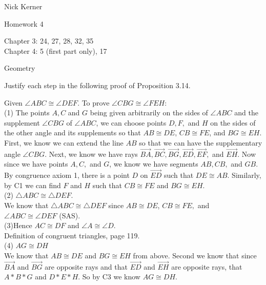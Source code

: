 \documentclass[12pt,letterpaper]{article}
\newcommand{\pro}[1]{\noindent {\bf #1}}
\begin{document}
\begin{flushright}
Nick Kerner

Homework 4

Chapter 3: 24, 27, 28, 32, 35\\
Chapter 4: 5 (first part only), 17
\end{flushright}
\begin{center}
\large{Geometry}\\
\end{center}

\pro{24} Justify each step in the following proof of Proposition 3.14.

Given $\angle ABC \cong \angle DEF$.  To prove $\angle CBG \cong \angle FEH$:\\


\noindent (1) The points $A,C$ and $G$ being given arbitrarily on the sides of $\angle ABC$ and the supplement $\angle CBG$ of $\angle ABC$, we can choose points $D,F,$ and $H$ on the sides of the other angle and its supplements so that $AB \cong DE$, $CB \cong FE$, and $BG \cong EH$.\\

First, we know we can extend the line $AB$ so that we can have the supplementary angle $\angle CBG$.  Next, we know we have rays $\overrightarrow{BA},\overrightarrow{BC},\overrightarrow{BG}, \overrightarrow{ED}, \overrightarrow{EF},$ and $\overrightarrow{EH}$.  Now since we have points $A,C,$ and $G$, we know we have segments $AB,CB,$ and $GB$.  By congruence axiom 1, there is a point $D$ on $\overrightarrow{ED}$ such that $DE\cong AB$.  Similarly, by C1 we can find $F$ and $H$ such that $CB \cong FE$ and $BG \cong EH$.\\

\noindent (2) $\triangle ABC \cong \triangle DEF$.\\

We know that $\triangle ABC \cong \triangle DEF$ since $AB \cong DE$, $CB \cong FE,$ and $\angle ABC \cong \angle DEF$ (SAS).\\

\noindent (3)Hence $AC \cong DF$ and $\angle A \cong \angle D$.\\  

Definition of congruent triangles, page 119.\\

\noindent (4) $AG \cong DH$\\

We know that $AB \cong DE$ and $BG \cong EH$ from above.  Second we know that since $\overrightarrow{BA}$ and $\overrightarrow{BG}$ are opposite rays and that $\overrightarrow{ED}$ and $\overrightarrow{EH}$ are opposite rays, that $A*B*G$ and $D*E*H$.  So by C3 we know $AG \cong DH$.\\
\end{document}
